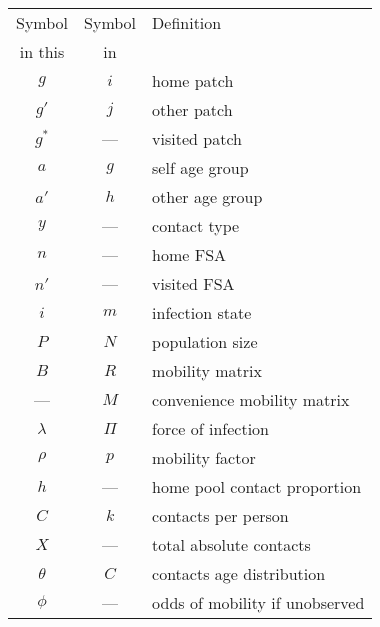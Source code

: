 \begin{tabular}{ccl}
  \toprule
   Symbol   &        Symbol        & Definition                     \\
   in this  & in \cite{Arenas2020} &                                \\
  \midrule
     $g$    &         $i$          & home patch                     \\
    $g'$    &         $j$          & other patch                    \\
    $g^*$   &         ---          & visited patch                  \\
     $a$    &         $g$          & self age group                 \\
    $a'$    &         $h$          & other age group                \\
     $y$    &         ---          & contact type                   \\
     $n$    &         ---          & home FSA                       \\
    $n'$    &         ---          & visited FSA                    \\
     $i$    &         $m$          & infection state                \\
     $P$    &         $N$          & population size                \\
     $B$    &         $R$          & mobility matrix                \\
     ---    &         $M$          & convenience mobility matrix    \\
  $\lambda$ &        $\Pi$         & force of infection             \\
   $\rho$   &         $p$          & mobility factor                \\
     $h$    &         ---          & home pool contact proportion   \\
     $C$    &         $k$          & contacts per person            \\
     $X$    &         ---          & total absolute contacts        \\
  $\theta$  &         $C$          & contacts age distribution      \\
   $\phi$   &         ---          & odds of mobility if unobserved \\
  \bottomrule
\end{tabular}
  